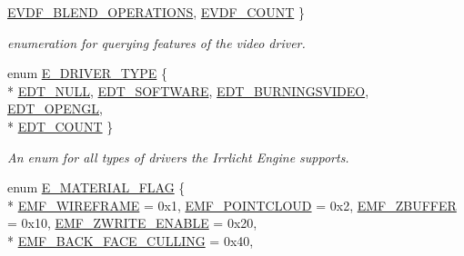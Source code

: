 \begin{DoxyCompactItemize}
\hyperlink{namespaceirr_1_1video_a57b1721e42a79c5dcf8e830e3621e08fa78ebcbf5e4255366ecf1eb5a23bcd1b5}{E\+V\+D\+F\+\_\+\+B\+L\+E\+N\+D\+\_\+\+O\+P\+E\+R\+A\+T\+I\+O\+NS}, 
\hyperlink{namespaceirr_1_1video_a57b1721e42a79c5dcf8e830e3621e08fa03872cc829d39f00dd56b912fd35132f}{E\+V\+D\+F\+\_\+\+C\+O\+U\+NT}
 \}\begin{DoxyCompactList}\small\item\em enumeration for querying features of the video driver. \end{DoxyCompactList}
\item 
enum \hyperlink{namespaceirr_1_1video_ae35a6de6d436c76107ad157fe42356d0}{E\+\_\+\+D\+R\+I\+V\+E\+R\+\_\+\+T\+Y\+PE} \{ \\*
\hyperlink{namespaceirr_1_1video_ae35a6de6d436c76107ad157fe42356d0acfdbd476cbfd4d05e72f9adffcc42210}{E\+D\+T\+\_\+\+N\+U\+LL}, 
\hyperlink{namespaceirr_1_1video_ae35a6de6d436c76107ad157fe42356d0a1598cd235a1a6bd052e2011b559e8995}{E\+D\+T\+\_\+\+S\+O\+F\+T\+W\+A\+RE}, 
\hyperlink{namespaceirr_1_1video_ae35a6de6d436c76107ad157fe42356d0ae85481da26159b967191ccc6de1e4a05}{E\+D\+T\+\_\+\+B\+U\+R\+N\+I\+N\+G\+S\+V\+I\+D\+EO}, 
\hyperlink{namespaceirr_1_1video_ae35a6de6d436c76107ad157fe42356d0a2715182a79f1cb8e2826fd68a8150a53}{E\+D\+T\+\_\+\+O\+P\+E\+N\+GL}, 
\\*
\hyperlink{namespaceirr_1_1video_ae35a6de6d436c76107ad157fe42356d0ae685cada50f8c100403134d932d0414c}{E\+D\+T\+\_\+\+C\+O\+U\+NT}
 \}\begin{DoxyCompactList}\small\item\em An enum for all types of drivers the Irrlicht Engine supports. \end{DoxyCompactList}
\item 
enum \hyperlink{namespaceirr_1_1video_a8a3bc00ae8137535b9fbc5f40add70d3}{E\+\_\+\+M\+A\+T\+E\+R\+I\+A\+L\+\_\+\+F\+L\+AG} \{ \\*
\hyperlink{namespaceirr_1_1video_a8a3bc00ae8137535b9fbc5f40add70d3abc620823efed8d6bdbd46c8a0180893a}{E\+M\+F\+\_\+\+W\+I\+R\+E\+F\+R\+A\+ME} = 0x1, 
\hyperlink{namespaceirr_1_1video_a8a3bc00ae8137535b9fbc5f40add70d3a3726bbddc57e6b37b05481b640eefb07}{E\+M\+F\+\_\+\+P\+O\+I\+N\+T\+C\+L\+O\+UD} = 0x2, 
\hyperlink{namespaceirr_1_1video_a8a3bc00ae8137535b9fbc5f40add70d3a493bb44efafebb48adab96e31eb029e5}{E\+M\+F\+\_\+\+Z\+B\+U\+F\+F\+ER} = 0x10, 
\hyperlink{namespaceirr_1_1video_a8a3bc00ae8137535b9fbc5f40add70d3a4bc03b7b9dd19e577bf909313ea62510}{E\+M\+F\+\_\+\+Z\+W\+R\+I\+T\+E\+\_\+\+E\+N\+A\+B\+LE} = 0x20, 
\\*
\hyperlink{namespaceirr_1_1video_a8a3bc00ae8137535b9fbc5f40add70d3ae1d176d0ce05ccc5df9e43ce854393bb}{E\+M\+F\+\_\+\+B\+A\+C\+K\+\_\+\+F\+A\+C\+E\+\_\+\+C\+U\+L\+L\+I\+NG} = 0x40, 

\end{DoxyCompactItemize}
